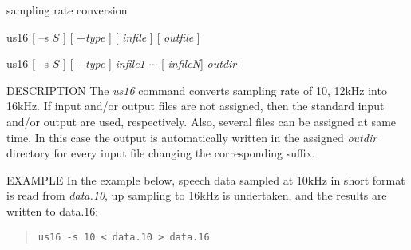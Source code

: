 %
{sampling rate conversion}

\begin{synopsis}
\item [us16] [ --s $S$ ] [ +{\em type} ] [ {\em infile} ] [ {\em outfile} ]
\item [us16] [ --s $S$ ] [ +{\em type} ] {\em infile1} $\cdots$ [ {\em infileN}] {\em outdir} 
\end{synopsis}

\begin{qsection}{DESCRIPTION}
The {\em us16} command converts sampling rate of 10, 12kHz
into 16kHz.
If input and/or output files are not assigned,
then the standard input and/or output are used, respectively.
Also, several files can be assigned at same time.
In this case the output is automatically written in the assigned
{\em outdir} directory for every input file
changing the corresponding suffix.
\par
\end{qsection}

\begin{options}
\end{options}

\begin{qsection}{EXAMPLE}
In the example below, speech data sampled at 10kHz in short format
is read from {\em data.10}, up sampling to 16kHz is undertaken,
and the results are written to {data.16}:
\begin{quote}
\verb!us16 -s 10 < data.10 > data.16!
\end{quote}
\end{qsection}


